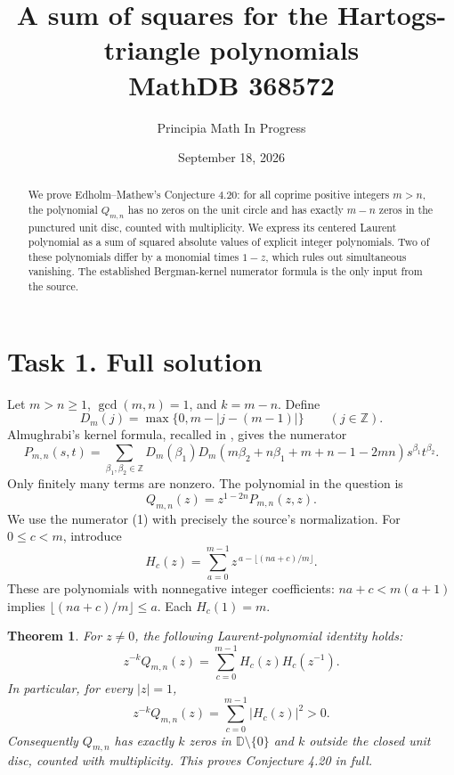 \documentclass[11pt]{article}
\title{A sum of squares for the Hartogs-triangle polynomials\\\large MathDB 368572}
\author{Principia Math In Progress}
\date{September 18, 2026}
\newtheorem{theorem}{Theorem}
\newcommand{\Z}{\mathbb Z}
\newcommand{\D}{\mathbb D}
\begin{document}
\maketitle
\begin{abstract}
We prove Edholm--Mathew's Conjecture 4.20: for all coprime positive
integers $m>n$, the polynomial $Q_{m,n}$ has no zeros on the unit
circle and has exactly $m-n$ zeros in the punctured unit disc, counted
with multiplicity. We express its centered Laurent polynomial as a
sum of squared absolute values of explicit integer polynomials.
Two of these polynomials differ by a monomial times $1-z$, which
rules out simultaneous vanishing. The established Bergman-kernel
numerator formula is the only input from the source.
\end{abstract}

\section*{Task 1. Full solution}
Let $m>n\ge1$, $\gcd(m,n)=1$, and $k=m-n$. Define
\[
 D_m(j)=\max\{0,m-|j-(m-1)|\}\qquad(j\in\Z).
\]
Almughrabi's kernel formula, recalled in
\cite[Proposition 1.10, equation (1.11)]{EM}, gives the numerator
\[
 P_{m,n}(s,t)=\sum_{\beta_1,\beta_2\in\Z}
 D_m(\beta_1)D_m(m\beta_2+n\beta_1+m+n-1-2mn)
 s^{\beta_1}t^{\beta_2}.                                         \tag{1}
\]
Only finitely many terms are nonzero. The polynomial in the question is
\[
 Q_{m,n}(z)=z^{1-2n}P_{m,n}(z,z).
\]
We use the numerator (1) with precisely the source's normalization.
For $0\le c<m$, introduce
\[
 H_c(z)=\sum_{a=0}^{m-1}z^{\,a-\lfloor(na+c)/m\rfloor}.           \tag{2}
\]
These are polynomials with nonnegative integer coefficients:
$na+c<m(a+1)$ implies $\lfloor(na+c)/m\rfloor\le a$.
Each $H_c(1)=m$.

\begin{theorem}\label{main}
For $z\ne0$, the following Laurent-polynomial identity holds:
\[
 \boxed{\ z^{-k}Q_{m,n}(z)=\sum_{c=0}^{m-1}H_c(z)H_c(z^{-1}).\ }  \tag{3}
\]
In particular, for every $|z|=1$,
\[
 z^{-k}Q_{m,n}(z)=\sum_{c=0}^{m-1}|H_c(z)|^2>0.                  \tag{4}
\]
Consequently $Q_{m,n}$ has exactly $k$ zeros in $\D\setminus\{0\}$
and $k$ outside the closed unit disc, counted with multiplicity.
This proves Conjecture 4.20 in full.
\end{theorem}
\end{document}

